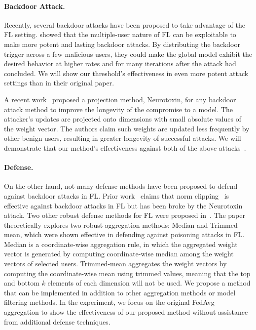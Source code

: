 \documentclass{article} %
\newcommand{\yli}[1]{{\color{cyan}#1}}
\begin{document}
\vspace{-10pt}
\paragraph{Backdoor Attack.} Recently, several backdoor attacks have been proposed to take advantage of the FL setting. \cite{dba} showed that the multiple-user nature of FL can be exploitable to make more potent and lasting backdoor attacks. By distributing the backdoor trigger across a few malicious users, they could make the global model exhibit the desired behavior at higher rates and for many iterations after the attack had concluded. We will show our threshold's effectiveness in even more potent attack settings than in their original paper. 

A recent work~\citep{neurotoxin} proposed a projection method, Neurotoxin, for any backdoor attack method to improve the longevity of the compromise to a model. The attacker's updates are projected onto \yli{dimensions with small absolute values of the weight vector}.
The authors claim such weights are updated less frequently by other benign users, resulting in greater longevity of successful attacks. We will demonstrate that our method's effectiveness against both of the above attacks~\citep{dba,neurotoxin}.

\vspace{-10pt}
\paragraph{Defense.} \yli{On the other hand, not many defense methods have been proposed to defend against backdoor attacks in FL. Prior work~\citep{shejwalkar2022back} claims that norm clipping~\citep{sun2019can} is effective against backdoor attacks in FL but has been broke by the Neurotoxin attack.}
Two other robust defense methods for FL were proposed in~\citep{trim-mean}. The paper theoretically explores two robust aggregation methods: Median and Trimmed-mean, which were shown effective in defending against poisoning attacks in FL. Median is a coordinate-wise aggregation rule, in which the aggregated weight vector is generated by computing coordinate-wise median among the weight vectors of selected users. Trimmed-mean aggregates the weight vectors by computing the coordinate-wise mean using trimmed values, meaning that the top and bottom $k$ elements of each dimension will not be used.
We propose a method that can be implemented in addition to other aggregation methods or model filtering methods. In the experiment, we focus on the original FedAvg~\citep{fedavg} aggregation to show the effectiveness of our proposed method without assistance from additional defense techniques. 
\end{document}
